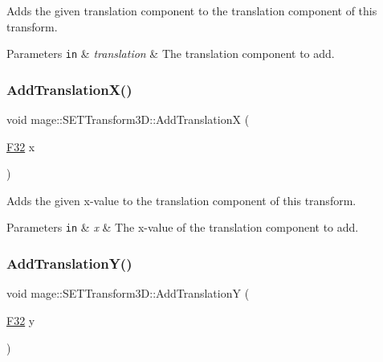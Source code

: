 Adds the given translation component to the translation component of this transform.


\begin{DoxyParams}[1]{Parameters}
\mbox{\tt in}  & {\em translation} & The translation component to add. \\
\hline
\end{DoxyParams}
\mbox{\label{classmage_1_1_s_e_t_transform3_d_af1ac42f0c05a13df88ee971fc198ac5a}} 
\subsubsection{\texorpdfstring{Add\+Translation\+X()}{AddTranslationX()}}
{\footnotesize\ttfamily void mage\+::\+S\+E\+T\+Transform3\+D\+::\+Add\+TranslationX (\begin{DoxyParamCaption}\item[{\mbox{\hyperlink{namespacemage_aa97e833b45f06d60a0a9c4fc22ae02c0}{F32}}}]{x }\end{DoxyParamCaption})\hspace{0.3cm}{\ttfamily [noexcept]}}

Adds the given x-\/value to the translation component of this transform.


\begin{DoxyParams}[1]{Parameters}
\mbox{\tt in}  & {\em x} & The x-\/value of the translation component to add. \\
\hline
\end{DoxyParams}
\mbox{\label{classmage_1_1_s_e_t_transform3_d_aaa515b56bff18d9d10ac79f72e5dcb4f}} 
\subsubsection{\texorpdfstring{Add\+Translation\+Y()}{AddTranslationY()}}
{\footnotesize\ttfamily void mage\+::\+S\+E\+T\+Transform3\+D\+::\+Add\+TranslationY (\begin{DoxyParamCaption}\item[{\mbox{\hyperlink{namespacemage_aa97e833b45f06d60a0a9c4fc22ae02c0}{F32}}}]{y }\end{DoxyParamCaption})\hspace{0.3cm}{\ttfamily [noexcept]}}

